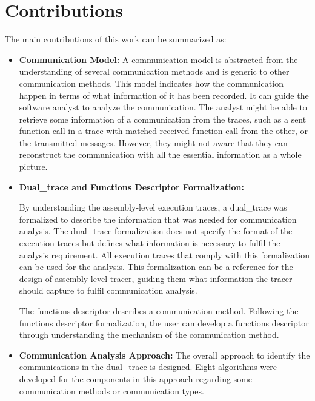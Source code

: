 \section{Contributions}
The main contributions of this work can be summarized as:
\begin{itemize}
  \item \textbf{Communication Model:} A communication model is abstracted from the understanding of several communication methods and is generic to other communication methods. This model indicates how the communication happen in terms of what information of it has been recorded. It can guide the software analyst to analyze the communication. The analyst might be able to retrieve some information of a communication from the traces, such as a sent function call in a trace with matched received function call from the other, or the transmitted messages. However, they might not aware that they can reconstruct the communication with all the essential information as a whole picture.
  
  \item \textbf{Dual\_trace and Functions Descriptor Formalization:} 
  
By understanding the assembly-level execution traces, a dual\_trace was formalized to describe the information that was needed for communication analysis. The dual\_trace formalization does not specify the format of the execution traces but defines what information is necessary to fulfil the analysis requirement. All execution traces that comply with this formalization can be used for the analysis. This formalization can be a reference for the design of assembly-level tracer, guiding them what information the tracer should capture to fulfil communication analysis.

The functions descriptor describes a communication method. Following the functions descriptor formalization, the user can develop a functions descriptor through understanding the mechanism of the communication method.

  \item \textbf{Communication Analysis Approach:} The overall approach to identify the communications in the dual\_trace is designed. Eight algorithms were developed for the components in this approach regarding some communication methods or communication types. 
  

\end{itemize}
